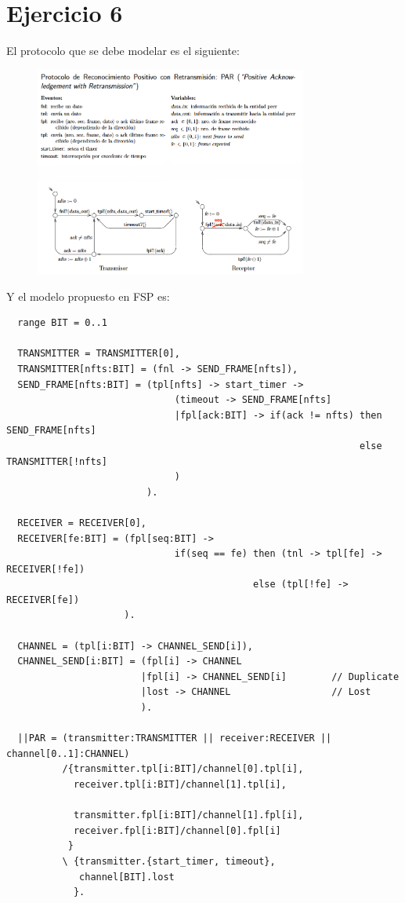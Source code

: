 \documentclass{article}
\begin{document}
\section*{Ejercicio 6}
El protocolo que se debe modelar es el siguiente:
\begin{figure}[ht]
	\includegraphics[width=0.8\textwidth]{02-06.png}
	\centering
\end{figure}

Y el modelo propuesto en FSP es:
\begin{verbatim}
  range BIT = 0..1

  TRANSMITTER = TRANSMITTER[0],
  TRANSMITTER[nfts:BIT] = (fnl -> SEND_FRAME[nfts]),
  SEND_FRAME[nfts:BIT] = (tpl[nfts] -> start_timer -> 
                              (timeout -> SEND_FRAME[nfts]
                              |fpl[ack:BIT] -> if(ack != nfts) then SEND_FRAME[nfts]
                                                               else TRANSMITTER[!nfts]
                              )
                         ).

  RECEIVER = RECEIVER[0],
  RECEIVER[fe:BIT] = (fpl[seq:BIT] ->
                              if(seq == fe) then (tnl -> tpl[fe] -> RECEIVER[!fe])
                                            else (tpl[!fe] -> RECEIVER[fe])
                     ).

  CHANNEL = (tpl[i:BIT] -> CHANNEL_SEND[i]),
  CHANNEL_SEND[i:BIT] = (fpl[i] -> CHANNEL 
                        |fpl[i] -> CHANNEL_SEND[i]        // Duplicate 
                        |lost -> CHANNEL                  // Lost     
                        ).

  ||PAR = (transmitter:TRANSMITTER || receiver:RECEIVER || channel[0..1]:CHANNEL)
          /{transmitter.tpl[i:BIT]/channel[0].tpl[i],
            receiver.tpl[i:BIT]/channel[1].tpl[i],

            transmitter.fpl[i:BIT]/channel[1].fpl[i],
            receiver.fpl[i:BIT]/channel[0].fpl[i]
           }
          \ {transmitter.{start_timer, timeout},
             channel[BIT].lost
            }.
\end{verbatim}
\end{document}
